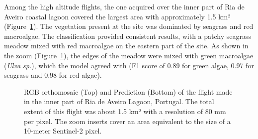 \documentclass[
  number]{elsarticle}
\begin{document}
Among the high altitude flights, the one acquired over the inner part of
Ria de Aveiro coastal lagoon covered the largest area with approximately
1.5 km² (Figure~\ref{fig-Boat}). The vegetation present at the site was
dominated by seagrass and red macroalgae. The classification provided
consistent results, with a patchy seagrass meadow mixed with red
macroalgae on the eastern part of the site. As shown in the zoom
(Figure~\ref{fig-Boat}), the edges of the meadow were mixed with green
macroalgae (\emph{Ulva sp.}), which the model agreed with (F1 score of
0.89 for green algae, 0.97 for seagrass and 0.98 for red algae).

\label{cell-fig-Boat}
\begin{figure}[H]


\caption{\label{fig-Boat}RGB orthomosaic (Top) and Prediction (Bottom)
of the flight made in the inner part of Ria de Aveiro Lagoon, Portugal.
The total extent of this flight was about 1.5 km² with a resolution of
80 mm per pixel. The zoom inserts cover an area equivalent to the size
of a 10-meter Sentinel-2 pixel.}

\end{figure}%
\end{document}
